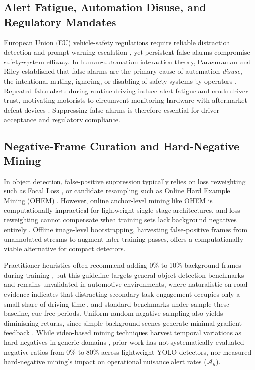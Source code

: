 \documentclass[conference]{IEEEtran}
\begin{document}
\subsection{Alert Fatigue, Automation Disuse, and Regulatory Mandates}
European Union (EU) vehicle-safety regulations require reliable distraction detection and prompt warning escalation \cite{ec2026safercars}, yet persistent false alarms compromise safety-system efficacy. In human-automation interaction theory, Parasuraman and Riley established that false alarms are the primary cause of automation \textit{disuse}, the intentional muting, ignoring, or disabling of safety systems by operators \cite{parasuraman1997humans}. Repeated false alerts during routine driving induce alert fatigue and erode driver trust, motivating motorists to circumvent monitoring hardware with aftermarket defeat devices \cite{lambert2026chinese, parasuraman1997humans}. Suppressing false alarms is therefore essential for driver acceptance and regulatory compliance.

\subsection{Negative-Frame Curation and Hard-Negative Mining}
In object detection, false-positive suppression typically relies on loss reweighting such as Focal Loss \cite{lin2017focal}, or candidate resampling such as Online Hard Example Mining (OHEM) \cite{shrivastava2016ohem}. However, online anchor-level mining like OHEM is computationally impractical for lightweight single-stage architectures, and loss reweighting cannot compensate when training sets lack background negatives entirely \cite{lin2017focal}. Offline image-level bootstrapping, harvesting false-positive frames from unannotated streams to augment later training passes, offers a computationally viable alternative for compact detectors.

Practitioner heuristics often recommend adding 0\% to 10\% background frames during training \cite{ultralytics2023guidelines}, but this guideline targets general object detection benchmarks and remains unvalidated in automotive environments, where naturalistic on-road evidence indicates that distracting secondary-task engagement occupies only a small share of driving time \cite{stutts2005}, and standard benchmarks under-sample these baseline, cue-free periods. Uniform random negative sampling also yields diminishing returns, since simple background scenes generate minimal gradient feedback \cite{shrivastava2016ohem, jin2018video}. While video-based mining techniques harvest temporal variations as hard negatives in generic domains \cite{jin2018video}, prior work has not systematically evaluated negative ratios from 0\% to 80\% across lightweight YOLO detectors, nor measured hard-negative mining's impact on operational nuisance alert rates ($\mathcal{A}_h$).
\end{document}
